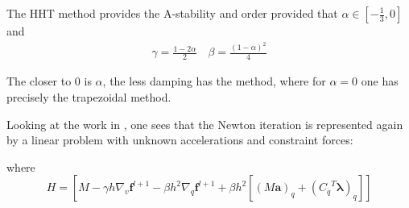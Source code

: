 \documentclass{digitaldynamics}
\def\vect#1{\bm{#1}}
\def\matr#1{{#1}}
\begin{document}
The HHT method provides the A-stability and order provided that $\alpha \in [-\frac{1}{3},0]$ and 
%
\begin{align}
\gamma = \frac{1-2\alpha}{2} \quad \beta=\frac{(1-\alpha)^2}{4}
\end{align}

The closer to 0 is $\alpha$, the less damping has the method, where for $\alpha=0$ one has precisely the trapezoidal method.

Looking at the work in \cite{negrutHHT07}, one sees that the Newton iteration is represented again by a linear problem with unknown accelerations and constraint forces:


 
where 
\[
\matr{H} = 
\left[
\matr{M}
- \gamma h  \nabla_v \vect{f}^{l+1}
- \beta h^2 \nabla_q \vect{f}^{l+1}
+ \beta h^2 \left[ (\matr{M}\vect{a})_q + (\matr{C_q}^T\vect{\lambda})_q \right]
\right]
\]
\end{document}
